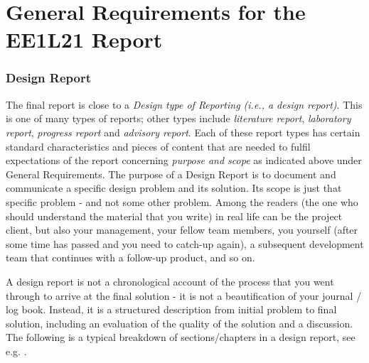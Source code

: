 \chapter{ General Requirements for the EE1L21 Report}


\subsection{ Design Report}

  The final report is close to a \textit{Design type of Reporting (i.e., a design report)}. This is one of many types of reports; other types include \textit{literature report}, \textit{laboratory report}, \textit{progress report }and \textit{advisory report}. Each of these report types has certain standard characteristics and pieces of content that are needed to fulfil expectations of the report concerning \textit{purpose and scope }as indicated above under General Requirements. The purpose of a Design Report is to document and communicate a specific design problem and its solution. Its scope is just that specific problem - and not some other problem. Among the readers (the one who should understand the material that you write) in real life can be the project client, but also your management, your fellow team members, you yourself (after some time has passed and you need to catch-up again), a subsequent development team that continues with a follow-up product, and so on.

  A design report is not a chronological account of the process that you went through to arrive at the final solution - it is not a beautification of your journal / log book. Instead, it is a structured description from initial problem to final solution, including an evaluation of the quality of the solution and a discussion. The following is a typical breakdown of sections/chapters in a design report, see e.g. \cite{Elling}.

